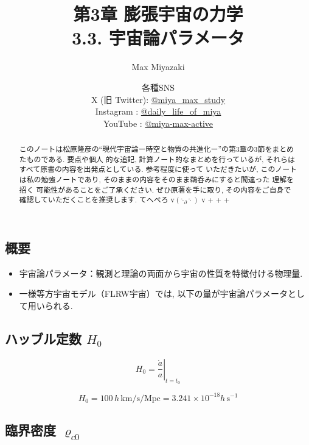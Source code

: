 \documentclass[a4paper,12pt]{article}
\title{第3章 膨張宇宙の力学\\
3.3. 宇宙論パラメータ}
\date{各種SNS\\
    X (旧 Twitter): \href{https://x.com/miya_max_study}{@miya\_max\_study}\\
    Instagram : \href{https://www.instagram.com/daily_life_of_miya/}{@daily\_life\_of\_miya}\\
    YouTube : \href{https://www.youtube.com/@miya-max-active}{@miya-max-active}
    }
\author{Max Miyazaki}
\begin{document}
\maketitle

\vspace{1cm}
\begin{abstract}
    このノートは松原隆彦の``現代宇宙論ー時空と物質の共進化ー''の第3章の3節をまとめたものである. 要点や個人
的な追記, 計算ノート的なまとめを行っているが, それらはすべて原書の内容を出発点としている. 参考程度に使って いただきたいが, このノートは私の勉強ノートであり, そのままの内容をそのまま鵜呑みにすると間違った
理解を招く 可能性があることをご了承ください. ぜひ原著を手に取り, その内容をご自身で確認していただくことを推奨します.  てへぺろ v$({\hat{\cdot}_\partial \hat{\cdot}})$
v                                                          +
+
+
\end{abstract}
    
    

\newpage

\color{blue}
\subsection*{概要}
\begin{itemize}

    \item 宇宙論パラメータ：観測と理論の両面から宇宙の性質を特徴付ける物理量.
    \item 一様等方宇宙モデル（FLRW宇宙）では, 以下の量が宇宙論パラメータとして用いられる.
  
  \end{itemize}
  
  \subsection*{ハッブル定数 $H_0$}
  
  \begin{equation*}
    H_0 = \left. \frac{\dot{a}}{a} \right|_{t = t_0}
  \end{equation*}
  
  \begin{equation*}
    H_0 = 100\, h\, \text{km/s/Mpc} = 3.241 \times 10^{-18} h\, \text{s}^{-1}
  \end{equation*}
  
  \subsection*{臨界密度 $\varrho_{c0}$}
  
\end{document}
